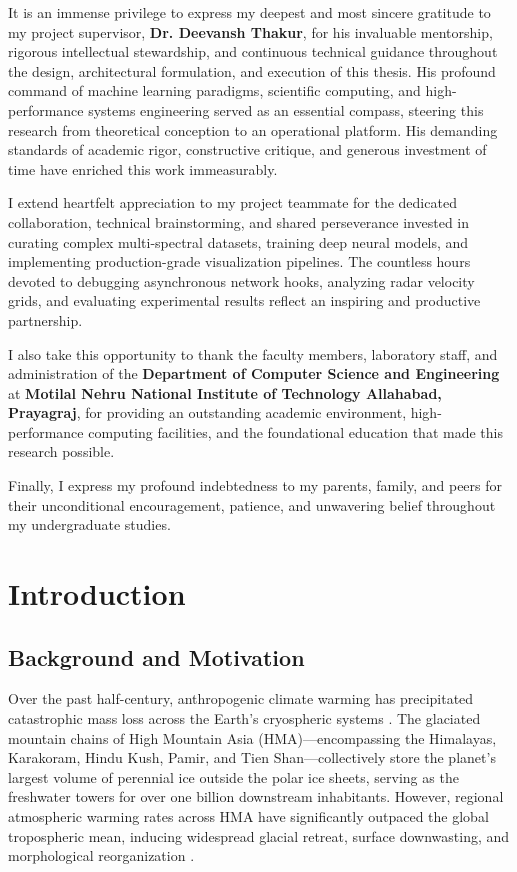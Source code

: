 \documentclass{mnnit}
\begin{document}
It is an immense privilege to express my deepest and most sincere gratitude to my project supervisor, \textbf{Dr. Deevansh Thakur}, for his invaluable mentorship, rigorous intellectual stewardship, and continuous technical guidance throughout the design, architectural formulation, and execution of this thesis. His profound command of machine learning paradigms, scientific computing, and high-performance systems engineering served as an essential compass, steering this research from theoretical conception to an operational platform. His demanding standards of academic rigor, constructive critique, and generous investment of time have enriched this work immeasurably.

I extend heartfelt appreciation to my project teammate for the dedicated collaboration, technical brainstorming, and shared perseverance invested in curating complex multi-spectral datasets, training deep neural models, and implementing production-grade visualization pipelines. The countless hours devoted to debugging asynchronous network hooks, analyzing radar velocity grids, and evaluating experimental results reflect an inspiring and productive partnership.

I also take this opportunity to thank the faculty members, laboratory staff, and administration of the \textbf{Department of Computer Science and Engineering} at \textbf{Motilal Nehru National Institute of Technology Allahabad, Prayagraj}, for providing an outstanding academic environment, high-performance computing facilities, and the foundational education that made this research possible.

Finally, I express my profound indebtedness to my parents, family, and peers for their unconditional encouragement, patience, and unwavering belief throughout my undergraduate studies.

\afterpreface

\chapter{Introduction}

\section{Background and Motivation}
Over the past half-century, anthropogenic climate warming has precipitated catastrophic mass loss across the Earth's cryospheric systems \cite{hugonnet2021accelerated}. The glaciated mountain chains of High Mountain Asia (HMA)---encompassing the Himalayas, Karakoram, Hindu Kush, Pamir, and Tien Shan---collectively store the planet's largest volume of perennial ice outside the polar ice sheets, serving as the freshwater towers for over one billion downstream inhabitants. However, regional atmospheric warming rates across HMA have significantly outpaced the global tropospheric mean, inducing widespread glacial retreat, surface downwasting, and morphological reorganization \cite{nie2017glacial, zheng2021assessment}.
\end{document}
